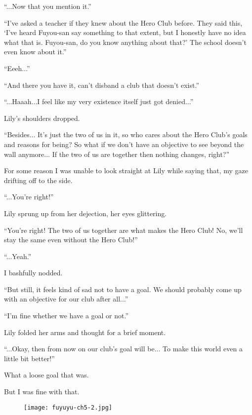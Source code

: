 ``...Now that you mention it.''

``I've asked a teacher if they knew about the Hero Club before. They said this, `I've heard Fuyou-san say something to that extent, but I honestly have no idea what that is. Fuyou-san, do you know anything about that?' The school doesn't even know about it.''

``Eeeh...''

``And there you have it, can't disband a club that doesn't exist.''

``...Haaah...I feel like my very existence itself just got denied...''

Lily's shoulders dropped.

``Besides... It's just the two of us in it, so who cares about the Hero Club's goals and reasons for being? So what if we don't have an objective to see beyond the wall anymore... If the two of us are together then nothing changes, right?''

For some reason I was unable to look straight at Lily while saying that, my gaze drifting off to the side.

``...You're right!''

Lily sprung up from her dejection, her eyes glittering.

``You're right! The two of us together are what makes the Hero Club! No, we'll stay the same even without the Hero Club!''

``...Yeah.''

I bashfully nodded.

``But still, it feels kind of sad not to have a goal. We should probably come up with an objective for our club after all...''

``I'm fine whether we have a goal or not.''

Lily folded her arms and thought for a brief moment.

``...Okay, then from now on our club's goal will be... To make this world even a little bit better!''

What a loose goal that was.

But I was fine with that.

\begin{figure}[p]
\texttt{[image: fuyuyu-ch5-2.jpg]}
\end{figure}

